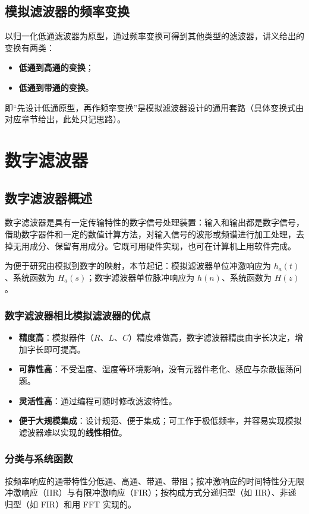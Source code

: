 \subsection{模拟滤波器的频率变换}
以归一化低通滤波器为原型，通过频率变换可得到其他类型的滤波器，讲义给出的变换有两类：
\begin{itemize}
\item \textbf{低通到高通的变换}；
\item \textbf{低通到带通的变换}。
\end{itemize}
即“先设计低通原型，再作频率变换”是模拟滤波器设计的通用套路（具体变换式由对应章节给出，此处只记思路）。

\section{数字滤波器}

\subsection{数字滤波器概述}
数字滤波器是具有一定传输特性的数字信号处理装置：输入和输出都是数字信号，借助数字器件和一定的数值计算方法，对输入信号的波形或频谱进行加工处理，去掉无用成分、保留有用成分。它既可用硬件实现，也可在计算机上用软件完成。

为便于研究由模拟到数字的映射，本节起记：模拟滤波器单位冲激响应为 $h_a(t)$、系统函数为 $H_a(s)$；数字滤波器单位脉冲响应为 $h(n)$、系统函数为 $H(z)$。

\subsubsection{数字滤波器相比模拟滤波器的优点}
\begin{itemize}
\item \textbf{精度高}：模拟器件（$R$、$L$、$C$）精度难做高，数字滤波器精度由字长决定，增加字长即可提高。
\item \textbf{可靠性高}：不受温度、湿度等环境影响，没有元器件老化、感应与杂散振荡问题。
\item \textbf{灵活性高}：通过编程可随时修改滤波特性。
\item \textbf{便于大规模集成}：设计规范、便于集成；可工作于极低频率，并容易实现模拟滤波器难以实现的\textbf{线性相位}。
\end{itemize}

\subsubsection{分类与系统函数}
按频率响应的通带特性分低通、高通、带通、带阻；按冲激响应的时间特性分无限冲激响应（IIR）与有限冲激响应（FIR）；按构成方式分递归型（如 IIR）、非递归型（如 FIR）和用 FFT 实现的。

